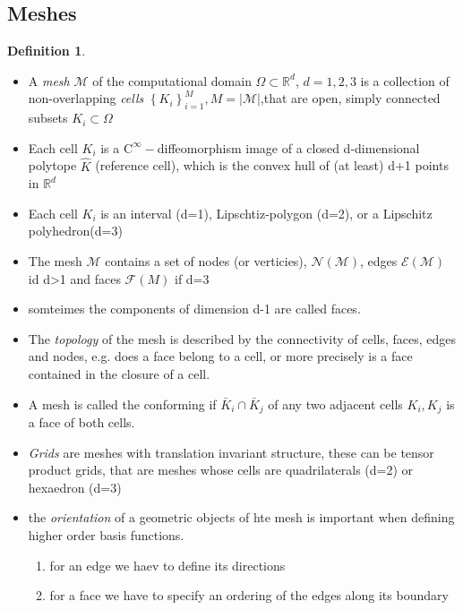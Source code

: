 \documentclass[english]{article}
\theoremstyle{definition}
\newtheorem*{defi}{Definition}
\theoremstyle{remark}
\newcommand{\M}{\mathcal{M}}
\newcommand{\N}{\mathcal{N}}
\newcommand{\E}{\mathcal{E}}
\newcommand{\RR}{\mathbb{R}}			%
\newcommand{\F}{\mathcal{F}}
\newcommand{\OO}{\Omega}
\newcommand{\cinf}{\tx{C}^\infty}
\newcommand{\tx}[1]{\text{#1}}
\begin{document}
  \subsection{Meshes}
  \begin{defi}
    \begin{itemize}
    \item A \emph{mesh} $\mathcal{M}$ of the computational domain $\OO\subset \RR^d$, $d=1,2,3$ is a collection of non-overlapping \emph{cells} $\left\{K_i \right\}^M_{i=1} , M = |\mathcal{M}|$,that are open, simply connected subsets $K_i \subset \OO$
    \item Each cell $K_i$ is a $\cinf-$diffeomorphism image of a closed d-dimensional polytope $\hat K$ (reference cell), which is the convex hull of (at least) d+1 points  in $\RR^d$\\
    \item Each cell $K_i$ is an interval (d=1), Lipschtiz-polygon (d=2), or a Lipschitz polyhedron(d=3)\\
    \item The mesh $\mathcal{M}$ contains a set of nodes (or verticies), $\N(\M)$, edges $\E(\M)$ id d>1 and faces $\F(M)$ if d=3\\
    \item somteimes the components of dimension d-1 are called faces.\\
    \item The \emph{topology} of the mesh is described by the connectivity of cells, faces, edges and nodes, e.g. does a face belong to a cell, or more precisely is a face contained in the closure of a cell.
    \item A mesh is called the conforming if $\bar K_i \cap \bar K_j$ of any two adjacent cells $K_i,K_j$ is a face of both cells.


    \item \emph{Grids} are meshes with translation invariant structure, these can be tensor product grids, that are meshes whose cells are quadrilaterals (d=2) or hexaedron (d=3)
    \item the \emph{orientation} of a geometric objects of hte mesh is important when defining higher order basis functions.
      \begin{enumerate}
      \item for an edge we haev to define its directions
      \item for a face we have to specify an ordering of the edges along its boundary
	

\end{enumerate}
\end{itemize}
\end{defi}
\end{document}
